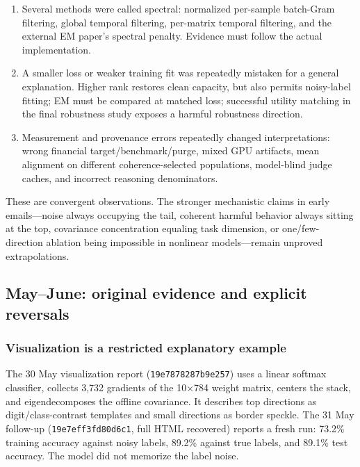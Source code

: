 \documentclass[
  british,
  10pt,
  a4paper,
]{article}
\providecommand{\tightlist}{%
  \setlength{\itemsep}{0pt}\setlength{\parskip}{0pt}}
\begin{document}
\begin{enumerate}
\def\labelenumi{\arabic{enumi}.}
\tightlist
\item
  Several methods were called spectral: normalized per-sample batch-Gram
  filtering, global temporal filtering, per-matrix temporal filtering,
  and the external EM paper's spectral penalty. Evidence must follow the
  actual implementati\allowbreak{}on.\allowbreak{}
\item
  A smaller loss or weaker training fit was repeatedly mistaken for a
  general explanation.\allowbreak{} Higher rank restores clean capacity,
  but also permits noisy-\allowbreak{}label fitting; EM must be compared
  at matched loss; successful utility matching in the final robustness
  study exposes a harmful robustness direction.
\item
  Measurement and provenance errors repeatedly changed interpretations:
  wrong financial
  target/\allowbreak{}benchmark/\allowbreak{}purge,\allowbreak{} mixed
  GPU artifacts, mean alignment on different
  coherence-\allowbreak{}selected populations,\allowbreak{}
  model-\allowbreak{}blind judge caches, and incorrect reasoning
  denominators\allowbreak{}.\allowbreak{}
\end{enumerate}

These are convergent observations\allowbreak{}.\allowbreak{} The
stronger mechanistic claims in early emails---noise always occupying the
tail, coherent harmful behavior always sitting at the top, covariance
concentration equaling task dimension, or
one/\allowbreak{}few-\allowbreak{}direction ablation being impossible in
nonlinear models---remain unproved
extrapolatio\allowbreak{}ns.\allowbreak{}

\subsection{May--June: original evidence and explicit
reversals}\label{email-evidence--mayjune-original-evidence-and-explicit-reversals}

\subsubsection{Visualization is a restricted explanatory
example}\label{email-evidence--visualization-is-a-restricted-explanatory-example}

The 30 May visualization report (\texttt{19e7878287b9\allowbreak{}e257})
uses a linear softmax classifier,\allowbreak{} collects 3,732 gradients
of the 10×784 weight matrix, centers the stack, and eigendecomposes the
offline covariance.\allowbreak{} It describes top directions as
digit/\allowbreak{}class-\allowbreak{}contrast templates and small
directions as border speckle. The 31 May follow-up
(\texttt{19e7eff3fd80\allowbreak{}d6c1}, full HTML recovered) reports a
fresh run: 73.2\% training accuracy against noisy labels, 89.2\% against
true labels, and 89.1\% test accuracy. The model did not memorize the
label noise.
\end{document}

